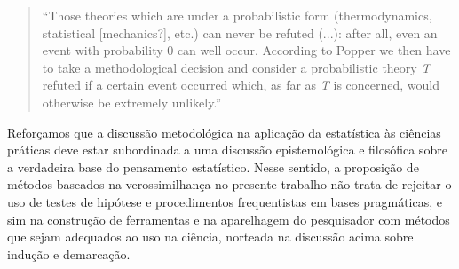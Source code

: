 \begin{quote}
``Those theories which are under a probabilistic form (thermodynamics, statistical [mechanics?], etc.) can never be refuted (...):
after all, even an event with probability 0 can well occur. According to Popper we then have to take a methodological decision
and consider a probabilistic theory {\em T} refuted if a certain event occurred which, as far as {\em T} is concerned, would 
otherwise be extremely unlikely.'' \citep{deFinetti2010}
\end{quote}

Reforçamos que a discussão metodológica na aplicação da estatística às ciências práticas deve estar subordinada a uma discussão
epistemológica e filosófica sobre a verdadeira base do pensamento estatístico. Nesse sentido, a proposição de
métodos baseados na verossimilhança no presente trabalho não trata de rejeitar o uso de testes de hipótese 
e procedimentos frequentistas em
bases pragmáticas, e sim na construção de ferramentas e na aparelhagem do pesquisador com métodos que sejam
adequados ao uso na ciência, norteada na discussão acima sobre indução e demarcação.
